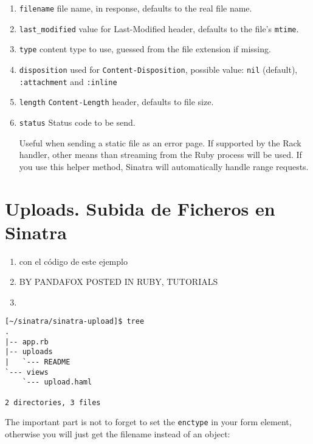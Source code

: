 \begin{enumerate}
\item 
\verb|filename|
file name, in response, defaults to the real file name.
\item 
\verb|last_modified|
value for Last-Modified header, defaults to the file's \verb|mtime|.
\item 
\verb|type|
content type to use, guessed from the file extension if missing.
\item 
\verb|disposition|
used for \verb|Content-Disposition|, possible value: \verb|nil| (default), \verb|:attachment| and 
\verb|:inline|
\item 
\verb|length|
\verb|Content-Length| header, defaults to file size.
\item 
\verb|status|
Status code to be send. 

Useful when sending a static file as an
error page. 
If supported by the Rack handler, other means than
streaming from the Ruby process will be used. If you use this helper
method, Sinatra will automatically handle range requests.
\end{enumerate}

\section{Uploads. Subida de Ficheros en Sinatra}

\begin{enumerate}
\item 
{}
con el código de este ejemplo
\item 
{} BY PANDAFOX POSTED IN RUBY, TUTORIALS
\item 
{}
\end{enumerate}

\begin{verbatim}
[~/sinatra/sinatra-upload]$ tree
.
|-- app.rb
|-- uploads
|   `--- README
`--- views
    `--- upload.haml

2 directories, 3 files
\end{verbatim}


The important part is not to forget to set the \verb|enctype| 
in your form element, otherwise you will just get the filename instead of an object:


